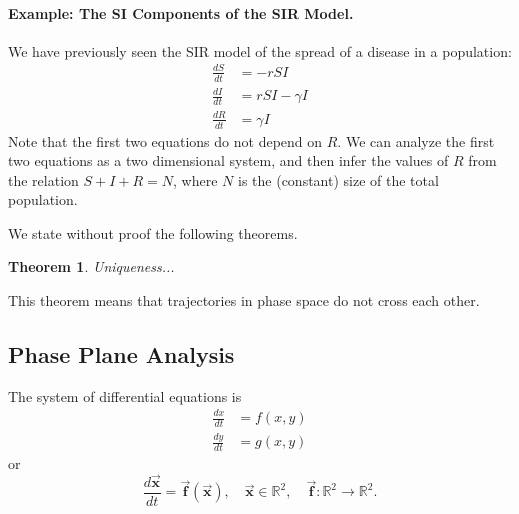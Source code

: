 \documentclass{book}
\newcommand{\BF}{\vec{\textbf{f}}}
\newcommand{\BX}{\vec{\textbf{x}}}
\newtheorem{theorem}{Theorem}
\begin{document}
\paragraph{Example: The SI Components of the SIR Model.}
We have previously seen the SIR model of the spread of
a disease in a population:
\begin{equation}
\begin{split}
   \frac{dS}{dt} & = -rSI \\
   \frac{dI}{dt} & = rSI -\gamma I \\
   \frac{dR}{dt} & = \gamma I
\end{split}
\end{equation}
Note that the first two equations do not depend on $R$.
We can analyze the first two equations as a two dimensional
system, and then infer the values of $R$ from the
relation $S+I+R=N$, where $N$ is the (constant) size
of the total population.

We state without proof the following theorems.
\begin{theorem}
Uniqueness...
\end{theorem}
This theorem means that trajectories in phase
space do not cross each other.
\subsection{Phase Plane Analysis}

The system of differential equations is
\begin{equation}
\begin{split}
   \frac{dx}{dt} & = f(x,y) \\
   \frac{dy}{dt} & = g(x,y)
\end{split}
\end{equation}
or
\begin{equation}
  \frac{d\BX}{dt} = \BF(\BX), \quad \BX \in \mathbb{R}^2, \quad
      \BF : \mathbb{R}^2 \rightarrow \mathbb{R}^2.
\end{equation}
\end{document}
